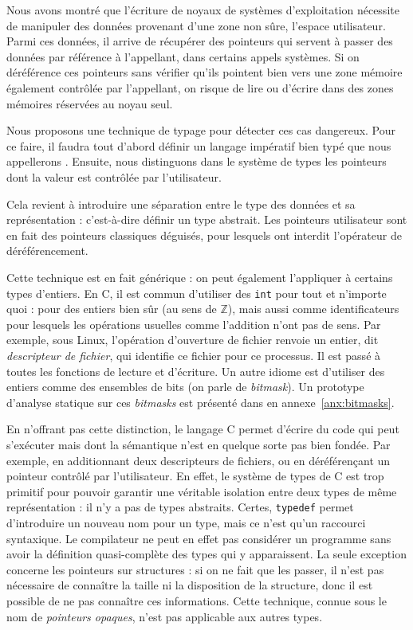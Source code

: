 
Nous avons montré que l'écriture de noyaux de systèmes d'exploitation nécessite
de manipuler des données provenant d'une zone non sûre, l'espace utilisateur.
Parmi ces données, il arrive de récupérer des pointeurs qui servent à passer des
données par référence à l'appellant, dans certains appels systèmes. Si on
déréférence ces pointeurs sans vérifier qu'ils pointent bien vers une zone
mémoire également contrôlée par l'appellant, on risque de lire ou d'écrire dans
des zones mémoires réservées au noyau seul.

Nous proposons une technique de typage pour détecter ces cas dangereux. Pour ce
faire, il faudra tout d'abord définir un langage impératif bien typé que nous
appellerons \langname. Ensuite, nous distinguons dans le système de types les
pointeurs dont la valeur est contrôlée par l'utilisateur.

Cela revient à introduire une séparation entre le type des données et sa
représentation : c'est-à-dire définir un type abstrait. Les pointeurs
utilisateur sont en fait des pointeurs classiques déguisés, pour lesquels ont
interdit l'opérateur de déréférencement.

Cette technique est en fait générique : on peut également l'appliquer à certains
types d'entiers. En C, il est commun d'utiliser des \texttt{int} pour tout et
n'importe quoi : pour des entiers bien sûr (au sens de $ℤ$), mais aussi comme
identificateurs pour lesquels les opérations usuelles comme l'addition n'ont pas
de sens. Par exemple, sous Linux, l'opération d'ouverture de fichier renvoie un
entier, dit \emph{descripteur de fichier}, qui identifie ce fichier pour ce
processus. Il est passé à toutes les fonctions de lecture et d'écriture. Un
autre idiome est d'utiliser des entiers comme des ensembles de bits (on parle de
\emph{bitmask}). Un prototype d'analyse statique sur ces \emph{bitmasks} est
présenté dans en annexe~\ref{anx:bitmasks}.


En n'offrant pas cette distinction, le langage C permet d'écrire du code qui
peut s'exécuter mais dont la sémantique n'est en quelque sorte pas bien fondée.
Par exemple, en additionnant deux descripteurs de fichiers, ou en déréférençant
un pointeur contrôlé par l'utilisateur. En effet, le système de types de C est
trop primitif pour pouvoir garantir une véritable isolation entre deux types de
même représentation : il n'y a pas de types abstraits. Certes, \texttt{typedef}
permet d'introduire un nouveau nom pour un type, mais ce n'est qu'un raccourci
syntaxique. Le compilateur ne peut en effet pas considérer un programme sans
avoir la définition quasi-complète des types qui y apparaissent. La seule
exception concerne les pointeurs sur structures : si on ne fait que les passer,
il n'est pas nécessaire de connaître la taille ni la disposition de la
structure, donc il est possible de ne pas connaître ces informations. Cette
technique, connue sous le nom de \emph{pointeurs opaques}, n'est pas applicable
aux autres types.

